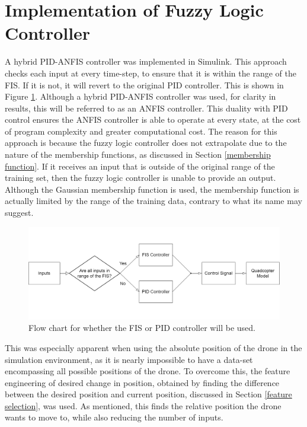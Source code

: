 \section{Implementation of Fuzzy Logic Controller}
A hybrid PID-ANFIS controller was implemented in Simulink. This approach checks each input at every time-step, to ensure that it is within the range of the FIS. If it is not, it will revert to the original PID controller. This is shown in Figure \ref{fig:Hybrid Control}. Although a hybrid PID-ANFIS controller was used, for clarity in results, this will be referred to as an ANFIS controller. This duality with PID control ensures the ANFIS controller is able to operate at every state, at the cost of program complexity and greater computational cost. The reason for this approach is because the fuzzy logic controller does not extrapolate due to the nature of the membership functions, as discussed in Section \ref{membership function}. If it receives an input that is outside of the original range of the training set, then the fuzzy logic controller is unable to provide an output. Although the Gaussian membership function is used, the membership function is actually limited by the range of the training data, contrary to what its name may suggest.
\begin{figure}[H]
    \centering
    \includegraphics[width = \textwidth]{./img/hybrid_control.png}
    \caption{Flow chart for whether the FIS or PID controller will be used.}
    \label{fig:Hybrid Control}
\end{figure}
This was especially apparent when using the absolute position of the drone in the simulation environment, as it is nearly impossible to have a data-set encompassing all possible positions of the drone. To overcome this, the feature engineering of desired change in position, obtained by finding the difference between the desired position and current position, discussed in Section \ref{feature selection}, was used. As mentioned, this finds the relative position the drone wants to move to, while also reducing the number of inputs.

